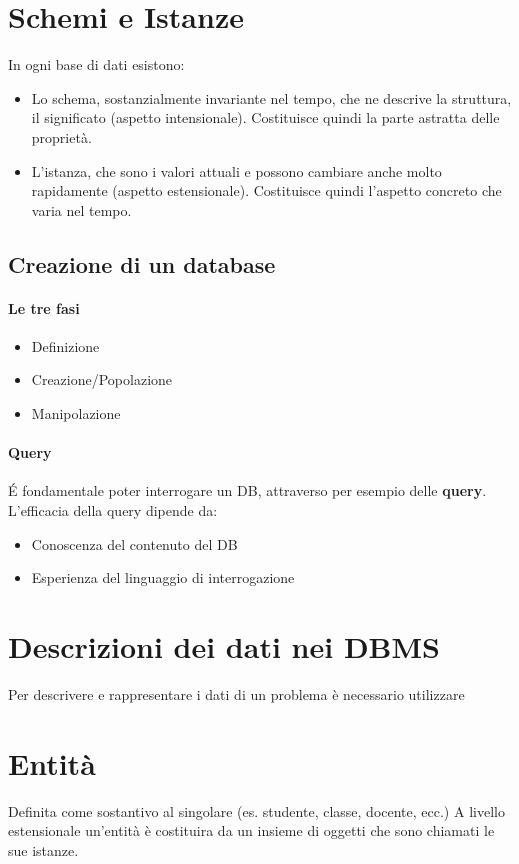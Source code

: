\section{Schemi e Istanze}
In ogni base di dati esistono:
\begin{itemize}
    \item Lo schema, sostanzialmente invariante nel tempo, che ne descrive la struttura,
    il significato (aspetto intensionale). Costituisce quindi la parte astratta delle
    proprietà.
    \item L'istanza, che sono i valori attuali e possono cambiare anche molto rapidamente 
    (aspetto estensionale). Costituisce quindi l'aspetto concreto che varia nel tempo.
\end{itemize}

\subsection{Creazione di un database}
\paragraph*{Le tre fasi}
\begin{itemize}
    \item Definizione
    \item Creazione/Popolazione
    \item Manipolazione
\end{itemize}

\paragraph*{Query}
\'E fondamentale poter interrogare un DB, attraverso per esempio delle \textbf{query}.
L'efficacia della query dipende da:
\begin{itemize}
    \item Conoscenza del contenuto del DB
    \item Esperienza del linguaggio di interrogazione
\end{itemize}

\section{Descrizioni dei dati nei DBMS}
Per descrivere e rappresentare i dati di un problema è necessario utilizzare 

\section{Entità}
Definita come sostantivo al singolare (es. studente, classe, docente, ecc.)
A livello estensionale un'entità è costituira da un insieme di oggetti che sono chiamati le sue istanze.